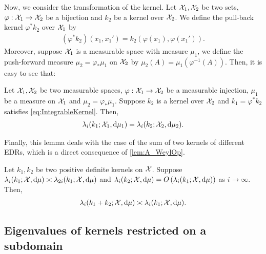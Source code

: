 Now, we consider the transformation of the kernel.
Let $\mathcal{X}_1,\mathcal{X}_2$ be two sets, $\varphi : \mathcal{X}_1 \to \mathcal{X}_2$ be a bijection and $k_2$ be a kernel over $\mathcal{X}_2$.
We define the pull-back kernel $\varphi^* k_2$ over $\mathcal{X}_1$ by
\begin{align*}
(\varphi^* k_2) (x_1,x_1')
  = k_2(\varphi(x_1),\varphi(x_1')).
\end{align*}
Moreover, suppose $\mathcal{X}_1$ is a measurable space with measure $\mu_1$, we define the push-forward measure $\mu_2 = \varphi_* \mu_1$ on $\mathcal{X}_2$ by
$\mu_2(A) = \mu_1(\varphi^{-1}(A))$.
Then, it is easy to see that:

\begin{proposition}
  \label{prop:MapKernel}
  Let $\mathcal{X}_1,\mathcal{X}_2$ be two measurable spaces, $\varphi : \mathcal{X}_1 \to \mathcal{X}_2$ be a measurable injection,
  $\mu_1$ be a measure on $\mathcal{X}_1$ and $\mu_2 = \varphi_* \mu_1$.
  Suppose $k_2$ is a kernel over $\mathcal{X}_2$ and $k_1 = \varphi^* k_2$ satisfies \cref{eq:IntegrableKernel}.
  Then,
  \begin{align}
    \label{eq:MapKernel}
    \lambda_i(k_1;\mathcal{X}_1,\dd \mu_1) = \lambda_i(k_2;\mathcal{X}_2,\dd \mu_2).
  \end{align}
\end{proposition}









Finally, this lemma deals with the case of the sum of two kernels of different EDRs,
which is a direct consequence of \cref{lem:A_WeylOp}.
\begin{lemma}
  \label{lem:B_SumEDR}
  Let $k_1,k_2$ be two positive definite kernels on $\mathcal{X}$.
  Suppose $\lambda_i(k_1;\mathcal{X},\dd \mu) \asymp \lambda_{2i}(k_1;\mathcal{X},\dd \mu)$ and
  $\lambda_i(k_2;\mathcal{X},\dd \mu) = O\left( \lambda_i(k_1;\mathcal{X},\dd \mu) \right)$ as $i \to \infty$.
  Then,
  \begin{align*}
    \lambda_i(k_1+k_2;\mathcal{X},\dd \mu) \asymp \lambda_i(k_1;\mathcal{X},\dd \mu).
  \end{align*}
\end{lemma}


\subsection{Eigenvalues of kernels restricted on a subdomain}


